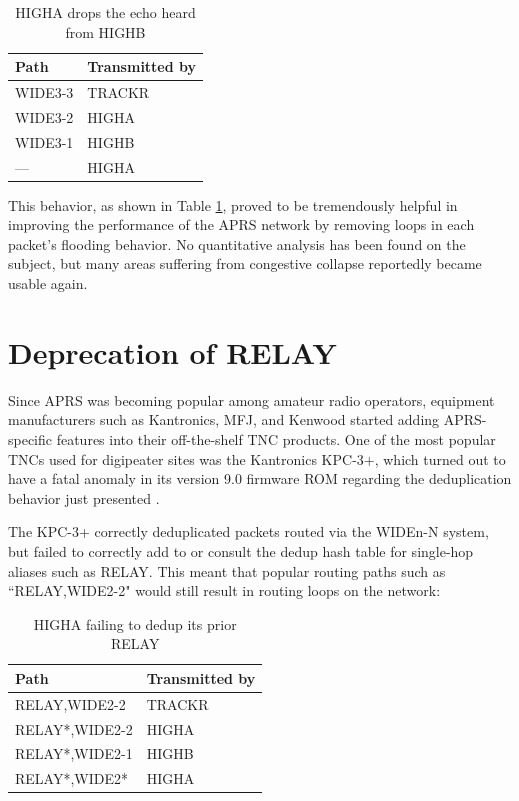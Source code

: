 \begin{table}[!h]
	\centering
	\begin{tabular}{ | l | l | }
		\hline
		Path & Transmitted by \\ \hline
		WIDE3-3 & TRACKR \\ \hline
		WIDE3-2 & HIGHA \\ \hline
		WIDE3-1 & HIGHB \\ \hline
		--- & HIGHA \\ \hline
	\end{tabular}
	\caption{HIGHA drops the echo heard from HIGHB}
	\label{tab:dropecho}
\end{table}
This behavior, as shown in Table \ref{tab:dropecho},
proved to be tremendously helpful in improving the performance
of the APRS network by removing loops in each packet's flooding behavior.
No quantitative analysis has been found on the subject, but many areas suffering
from congestive collapse reportedly became usable again.

\section{Deprecation of RELAY}

Since APRS was becoming popular among amateur radio operators,
equipment manufacturers such as Kantronics, MFJ, and Kenwood
started adding APRS-specific features into their off-the-shelf TNC products.
One of the most popular TNCs used for digipeater sites was the Kantronics KPC-3+,
which turned out to have a fatal anomaly in its 
version 9.0 firmware ROM regarding the deduplication behavior just
presented \cite{kpc3bugbulletin}.

The KPC-3+ correctly deduplicated packets routed via the WIDEn-N system,
but failed to correctly add to or consult the dedup hash table for single-hop
aliases such as RELAY.
This meant that popular routing paths such as ``RELAY,WIDE2-2" would
still result in routing loops on the network:

\begin{table}[!h]
	\centering
	\begin{tabular}{ | l | l | }
		\hline
		Path & Transmitted by \\ \hline
		RELAY,WIDE2-2 & TRACKR \\ \hline
		RELAY*,WIDE2-2 & HIGHA \\ \hline
		RELAY*,WIDE2-1 & HIGHB \\ \hline
		RELAY*,WIDE2* & HIGHA \\ \hline
	\end{tabular}
	\caption{HIGHA failing to dedup its prior RELAY}
	\label{tab:kpc3fail}
\end{table}

